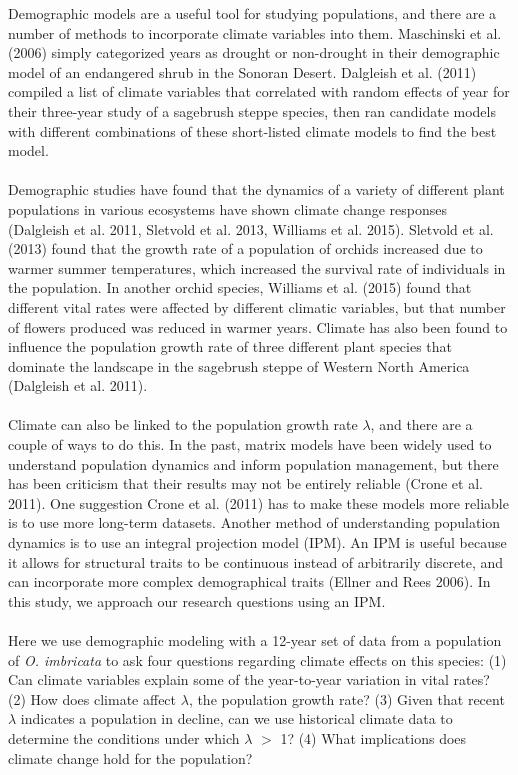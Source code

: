 \documentclass[12pt]{article}\usepackage[]{graphicx}\usepackage[]{color}
\begin{document}
Demographic models are a useful tool for studying populations, and there are a number of methods to incorporate climate variables into them. 
Maschinski et al. (2006) simply categorized years as drought or non-drought in their demographic model of an endangered shrub in the Sonoran Desert. 
Dalgleish et al. (2011) compiled a list of climate variables that correlated with random effects of year for their three-year study of a sagebrush steppe species, then ran candidate models with different combinations of these short-listed climate models to find the best model.\\ \\

Demographic studies have found that the dynamics of a variety of different plant populations in various ecosystems have shown climate change responses (Dalgleish et al. 2011, Sletvold et al. 2013, Williams et al. 2015).
Sletvold et al. (2013) found that the growth rate of a population of orchids increased due to warmer summer temperatures, which increased the survival rate of individuals in the population. 
In another orchid species, Williams et al. (2015) found that different vital rates were affected by different climatic variables, but that number of flowers produced was reduced in warmer years. 
Climate has also been found to influence the population growth rate of three different plant species that dominate the landscape in the sagebrush steppe of Western North America (Dalgleish et al. 2011).\\ \\

Climate can also be linked to the population growth rate \(\lambda\), and there are a couple of ways to do this. 
In the past, matrix models have been widely used to understand population dynamics and inform population management, but there has been criticism that their results may not be entirely reliable (Crone et al. 2011). 
One suggestion Crone et al. (2011) has to make these models more reliable is to use more long-term datasets. 
Another method of understanding population dynamics is to use an integral projection model (IPM). 
An IPM is useful because it allows for structural traits to be continuous instead of arbitrarily discrete, and can incorporate more complex demographical traits (Ellner and Rees 2006). 
In this study, we approach our research questions using an IPM.\\ \\

Here we use demographic modeling with a 12-year set of data from a population of \textit{O. imbricata} to ask four questions regarding climate effects on this species: (1) Can climate variables explain some of the year-to-year variation in vital rates? (2) How does climate affect \(\lambda\), the population growth rate? (3) Given that recent \(\lambda\) indicates a population in decline, can we use historical climate data to determine the conditions under which \(\lambda\) $>$ 1? (4) What implications does climate change hold for the population?
\end{document}
